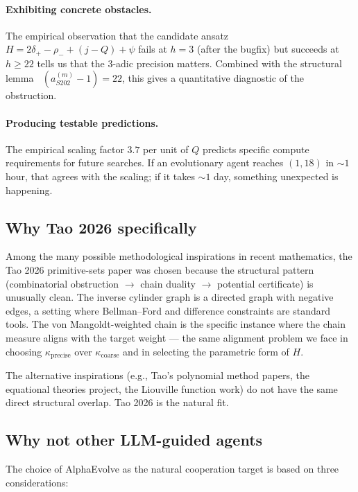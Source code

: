 \documentclass[11pt,a4paper]{article}
\theoremstyle{plain}
\theoremstyle{definition}
\newcommand{\aSat}{a_{S202}^{(m)}}
\DeclareMathOperator{\nuthree}{\nu_3}
\begin{document}
\paragraph{Exhibiting concrete obstacles.}
The empirical observation that the candidate ansatz
$H = 2\delta_+ - \rho_- + (j - Q) + \psi$ fails at $h = 3$ (after
the bugfix) but succeeds at $h \ge 22$ tells us that the
3-adic precision matters. Combined with the structural lemma
$\nuthree(\aSat - 1) = 22$, this gives a quantitative diagnostic
of the obstruction.

\paragraph{Producing testable predictions.}
The empirical scaling factor $3.7$ per unit of $Q$ predicts
specific compute requirements for future searches. If an
evolutionary agent reaches $(1, 18)$ in $\sim 1$ hour, that
agrees with the scaling; if it takes $\sim 1$ day, something
unexpected is happening.

\subsection{Why Tao 2026 specifically}

Among the many possible methodological inspirations in recent
mathematics, the Tao 2026 primitive-sets paper was chosen because
the structural pattern (combinatorial obstruction $\to$ chain
duality $\to$ potential certificate) is unusually clean. The
inverse cylinder graph is a directed graph with negative edges,
a setting where Bellman--Ford and difference constraints are
standard tools. The von Mangoldt-weighted chain is the
specific instance where the chain measure aligns with the target
weight — the same alignment problem we face in choosing
$\kappa_{\mathrm{precise}}$ over $\kappa_{\mathrm{coarse}}$ and
in selecting the parametric form of $H$.

The alternative inspirations (e.g., Tao's polynomial method
papers, the equational theories project, the Liouville function
work) do not have the same direct structural overlap. Tao 2026 is
the natural fit.

\subsection{Why not other LLM-guided agents}

The choice of AlphaEvolve as the natural cooperation target is
based on three considerations:
\end{document}
